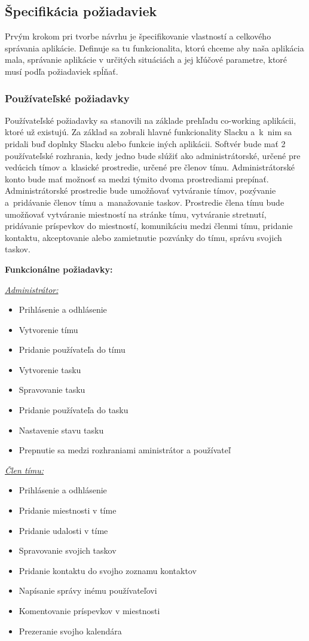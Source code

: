 \subsection{Špecifikácia požiadaviek}
\indent Prvým krokom pri tvorbe návrhu je špecifikovanie vlastností a celkového správania aplikácie. Definuje sa tu funkcionalita, ktorú chceme aby naša aplikácia mala, správanie aplikácie v určitých situáciách a jej kľúčové parametre, ktoré musí podľa požiadaviek spĺňať.
\subsubsection{Používateľské požiadavky} 
\indent Používateľské požiadavky sa stanovili na základe prehľadu co-working aplikácii, ktoré už existujú. Za základ sa zobrali hlavné funkcionality Slacku a k nim sa pridali buď doplnky Slacku alebo funkcie iných aplikácii. Softvér bude mať 2 používateľské rozhrania, kedy jedno bude slúžiť ako administrátorské, určené pre vedúcich tímov a klasické prostredie, určené pre členov tímu. Administrátorské konto bude mať možnosť sa medzi týmito dvoma prostrediami prepínať. Administrátorské prostredie bude umožňovať vytváranie tímov, pozývanie a pridávanie členov tímu a manažovanie taskov. Prostredie člena tímu bude umožňovať vytváranie miestností na stránke tímu, vytváranie stretnutí, pridávanie príspevkov do miestností, komunikáciu medzi členmi tímu, pridanie kontaktu, akceptovanie alebo zamietnutie pozvánky do tímu, správu svojich taskov.

\textbf{Funkcionálne požiadavky:}

\underline{\textit{Administrátor:}}
\indent\begin{itemize}
    \item Prihlásenie a odhlásenie
    \item Vytvorenie tímu
    \item Pridanie používateľa do tímu
    \item Vytvorenie tasku
    \item Spravovanie tasku
    \item Pridanie používateľa do tasku
    \item Nastavenie stavu tasku
    \item Prepnutie sa medzi rozhraniami aministrátor a používateľ
\end{itemize}
\newpage

\underline{\textit{Člen tímu:}}
\indent\begin{itemize}
    \item Prihlásenie a odhlásenie
    \item Pridanie miestnosti v tíme 
    \item Pridanie udalosti v tíme
    \item Spravovanie svojich taskov
    \item Pridanie kontaktu do svojho zoznamu kontaktov
    \item Napísanie správy inému používateľovi
    \item Komentovanie príspevkov v miestnosti
    \item Prezeranie svojho kalendára\newline
\end{itemize}



